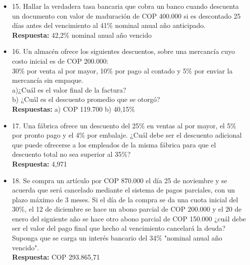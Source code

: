 \begin{itemize}
 \item 15. Hallar la verdadera tasa bancaria que cobra un banco cuando descuenta un documento con valor de maduración de COP 400.000 si es descontado 25 días antes del vencimiento al 41\% nominal anual año anticipado.\\

       \textbf{Respuesta:} 42,2\% nominal anual año vencido
       \medskip

 \item 16. Un almacén ofrece los siguientes descuentos, sobre una mercancía cuyo costo inicial es de COP 200.000:\\

       30\% por venta al por mayor, 10\% por pago al contado y 5\% por enviar la mercancía sin empaque.\\

       a)¿Cuál es el valor final de la factura?\\
       b) ¿Cuál es el descuento promedio que se otorgó?\\

       \textbf{Respuestas:} a) COP 119.700 b) 40,15\%
       \medskip

 \item 17. Una fábrica ofrece un descuento del 25\% en ventas al por mayor, el 5\% por pronto pago y el 4\% por embalaje. ¿Cuál debe ser el descuento adicional que puede ofrecerse a los empleados de la misma fábrica para que el descuento total no sea superior al 35\%?\\
       \textbf{Respuesta:} 4,971%
       \medskip

 \item 18. Se compra un artículo por COP 870.000 el día 25 de noviembre y se acuerda que será cancelado mediante el sistema de pagos parciales, con un plazo máximo de 3 meses. Si el día de la compra se da una cuota inicial del 30\%, el 12 de diciembre se hace un abono parcial de COP 200.000 y el 20 de enero del siguiente año se hace otro abono parcial de COP 150.000 ¿cuál debe ser el valor del pago final que hecho al vencimiento cancelará la deuda? Suponga que se carga un interés bancario del 34\% "nominal anual año vencido".\\

       \textbf{Respuesta:} COP 293.865,71
       \medskip

\end{itemize}